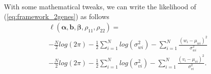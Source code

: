 \documentclass[aap, preprint]{imsart}
\numberwithin{equation}{section}
\theoremstyle{plain}
\begin{document}
With some mathematical tweaks, we can write the likelihood of (\ref{eq:framework_2genes}) as follows
\begin{equation}
\begin{multlined}
\ell(\bm{\alpha}, \bm{b}, \bm{\beta}, \rho_{11}, \rho_{22}) = \\
-\frac{N}{2} log(2\pi) - \frac{1}{2} \sum_{i=1}^{N} log (\sigma_{wi}^2) - \sum_{i=1}^{N} \frac{(w_i - \mu_{wi})^2}{\sigma_{wi}^2}\\
-\frac{N}{2} log(2\pi) - \frac{1}{2} \sum_{i=1}^{N} log (\sigma_{vi}^2) - \sum_{i=1}^{N} \frac{(v_i - \mu_{vi})^2}{\sigma_{vi}^2}.
\end{multlined}
    \label{eq:likelihood_2genes}
\end{equation}
\end{document}
